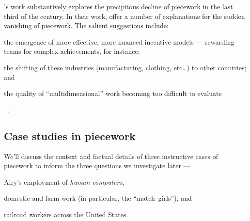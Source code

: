 \documentclass[trackingWork]{subfiles}
\begin{document}
\citeauthor{hart2013rise}'s work substantively explores the precipitous decline of piecework in the last third of the  century.
In their work, \citeauthor{hart2013rise} offer a number of explanations for the sudden vanishing of piecework.
The salient suggestions include:
\begin{inlinelist}
\item the emergence of more effective, more nuanced incentive models
--- rewarding teams for complex achievements, for instance;
\item the shifting of these industries (manufacturing, clothing, etc\dots)
to other countries; and
\item the quality of ``multidimensional'' work becoming too difficult to evaluate
\end{inlinelist}~\cite{hart2013rise}.


\subsection{Case studies in piecework}
We'll discuss the context and factual details of three instructive cases of piecework to inform the three questions we investigate later ---
\begin{numberlist}
  \item Airy's employment of \textit{human computers},
  \item domestic and farm work (in particular, the ``match--girls''), and
  \item railroad workers across the United States.
\end{numberlist}


\end{document}
